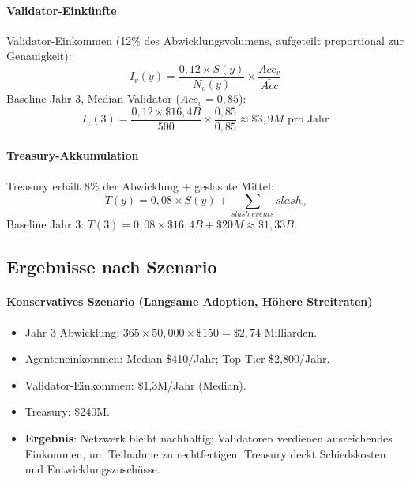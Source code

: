 \documentclass[11pt]{article}
\begin{document}
\paragraph{Validator-Einkünfte} Validator-Einkommen (12\% des Abwicklungsvolumens, aufgeteilt proportional zur Genauigkeit):
\begin{equation}
I_v(y) = \frac{0,12 \times S(y)}{N_v(y)} \times \frac{Acc_v}{\bar{Acc}}
\end{equation}
Baseline Jahr 3, Median-Validator ($Acc_v = 0,85$):
\begin{equation}
I_v(3) = \frac{0,12 \times \$16,4B}{500} \times \frac{0,85}{0,85} \approx \$3,9M \text{ pro Jahr}
\end{equation}

\paragraph{Treasury-Akkumulation} Treasury erhält 8\% der Abwicklung + geslashte Mittel:
\begin{equation}
T(y) = 0,08 \times S(y) + \sum_{slash \; events} slash_v
\end{equation}
Baseline Jahr 3: $T(3) = 0,08 \times \$16,4B + \$20M \approx \$1,33B$.

\subsection{Ergebnisse nach Szenario}
\paragraph{Konservatives Szenario (Langsame Adoption, Höhere Streitraten)}
\begin{itemize}[noitemsep]
  \item Jahr 3 Abwicklung: $365 \times 50{,}000 \times \$150 = \$2,74$ Milliarden.
  \item Agenteneinkommen: Median \$410/Jahr; Top-Tier \$2{,}800/Jahr.
  \item Validator-Einkommen: \$1,3M/Jahr (Median).
  \item Treasury: \$240M.
  \item \textbf{Ergebnis}: Netzwerk bleibt nachhaltig; Validatoren verdienen ausreichendes Einkommen, um Teilnahme zu rechtfertigen; Treasury deckt Schiedskosten und Entwicklungszuschüsse.
\end{itemize}
\end{document}
